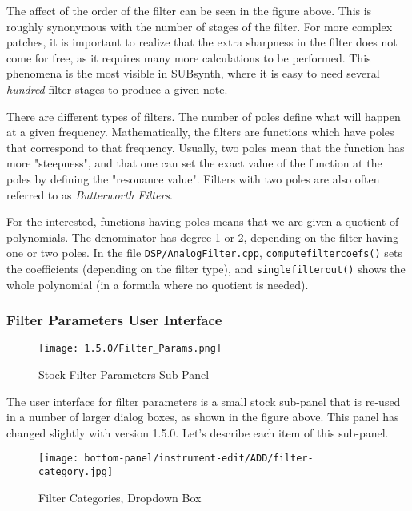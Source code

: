    The affect of the order of the filter can be seen in the figure above.
   This is roughly synonymous with the number of stages of the filter. For
   more complex patches, it is important to realize that the extra sharpness
   in the filter does not come for free, as it requires many more
   calculations to be performed. This phenomena is the most visible in
   SUBsynth, where it is easy to need several \textsl{hundred} filter stages
   to produce a given note.

   There are different types of filters. The number of poles define what will
   happen at a given frequency. Mathematically, the filters are functions which
   have poles that correspond to that frequency. Usually, two poles mean that
   the function has more "steepness", and that one can set the exact value of
   the function at the poles by defining the "resonance value". Filters with
   two poles are also often referred to as \textsl{Butterworth Filters}.

   For the interested, functions having poles means that we are given a
   quotient of polynomials. The denominator has degree 1 or 2, depending on the
   filter having one or two poles. In the file \texttt{DSP/AnalogFilter.cpp},
   \texttt{computefiltercoefs()} sets the coefficients
   (depending on the filter type), and
   \texttt{singlefilterout()} shows
   the whole polynomial (in a formula where no quotient is needed).

\subsubsection{Filter Parameters User Interface}
\label{subsubsec:filter_parameters_user_interface}

\begin{figure}[H]
   \centering
   \texttt{[image: 1.5.0/Filter\_Params.png]}
   \caption[Filter Parameters Sub-panel]{Stock Filter Parameters Sub-Panel}
   \label{fig:filter_parameters_subpanel}
\end{figure}

   The user interface for filter parameters is a small stock sub-panel that
   is re-used in a number of larger dialog boxes, as shown in the figure
   above.  This panel has changed slightly with version 1.5.0.
   Let's describe each item of this sub-panel.


\begin{figure}[H]
   \centering
   \texttt{[image: bottom-panel/instrument-edit/ADD/filter-category.jpg]}
   \caption[Filter Categories Dropdown]{Filter Categories, Dropdown Box}
   \label{fig:filter_categories_dropdown}
\end{figure}

